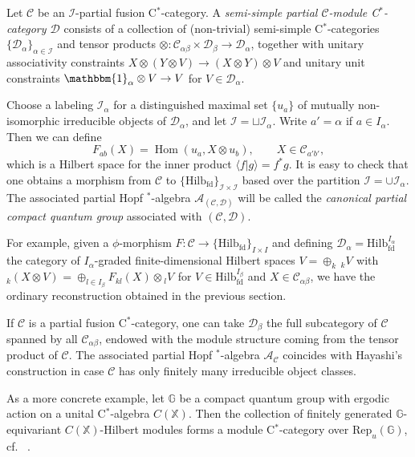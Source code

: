 \documentclass[10pt]{article}
\DeclareMathOperator{\fin}{\mathrm{fd}}
\DeclareMathOperator{\Hom}{Hom}
\newcommand{\G}{\mathbb{G}}
\newcommand{\CatC}{\mathcal{C}}
\newcommand{\CatD}{\mathcal{D}}
\newcommand{\CatCC}{\mathscr{C}}
\newcommand{\CatDD}{\mathscr{D}}
\newcommand{\Hilb}{\mathrm{Hilb}}
\newcommand{\Rep}{\mathrm{Rep}}
\newcommand{\GrDA}[3]{{}_{#2}#1_{#3}} %
\theoremstyle{definition}
\numberwithin{equation}{section}
\begin{document}
Let $\CatCC$ be an $\mathscr{I}$-partial fusion C$^*$-category. A \emph{semi-simple partial $\CatCC$-module C$^*$-category $\CatDD$} consists of a collection of (non-trivial) semi-simple C$^*$-categories $\{\CatD_{\alpha}\}_{\alpha\in \mathscr{I}}$ and  tensor products $\otimes: \CatC_{\alpha\beta}\times \CatD_{\beta}\rightarrow \CatD_{\alpha}$, together with unitary associativity constraints $X\otimes (Y\otimes V)\rightarrow (X\otimes Y)\otimes V$ and unitary unit constraints $\mathbbm{1}_{\alpha} \otimes V \rightarrow V$ for $V\in \CatD_{\alpha}$.

Choose a labeling $\mathcal{I}_{\alpha}$ for a distinguished maximal set $\{u_a\}$ of mutually non-isomorphic irreducible objects of $\CatD_{\alpha}$, and let $\mathcal{I} = \sqcup \mathcal{I}_{\alpha}$. Write $a' = \alpha$ if $a\in I_{\alpha}$. Then we can define \[F_{ab}(X)  = \Hom(u_a,  X\otimes u_b),\qquad X\in \CatC_{a'b'},\] which is a Hilbert space for the inner product $\langle f| g \rangle = f^*g$. It is easy to check that one obtains a morphism from $\CatCC$ to $\{\Hilb_{\fin}\}_{\mathcal{I}\times \mathcal{I}}$ based over the partition $\mathcal{I} = \cup \mathcal{I}_{\alpha}$. The associated partial Hopf $^*$-algebra $\mathscr{A}_{(\CatCC,\CatDD)}$ will be called the \emph{canonical partial compact quantum group} associated with $(\CatCC,\CatDD)$. 

For example, given a $\phi$-morphism $F:\CatCC \rightarrow  \{\Hilb_{\fin}\}_{I\times I}$ and defining $\CatDD_{\alpha} =\Hilb_{\fin}^{I_{\alpha}}$ the category of $I_{\alpha}$-graded finite-dimensional Hilbert spaces $V = \oplus_k\, \GrDA{V}{k}{}$ with $\GrDA{\left(X\otimes V\right)}{k}{} = \oplus_{l\in I_{\beta}} F_{kl}(X)\otimes \GrDA{V}{l}{}$ for $V\in \Hilb_{\fin}^{I_{\beta}}$ and $X\in \CatC_{\alpha\beta}$, we have the ordinary reconstruction obtained in the previous section. 

If $\CatCC$ is a partial fusion C$^*$-category, one can take $\CatD_{\beta}$ the full subcategory of $\CatC$ spanned by all $\CatC_{\alpha\beta}$, endowed with the module structure coming from the tensor product of $\CatCC$. The associated partial Hopf $^*$-algebra $\mathscr{A}_{\CatCC}$ coincides with Hayashi's construction \cite{Hay8} in case $\CatCC$ has only finitely many irreducible object classes. 

As a more concrete example, let $\G$ be a compact quantum group with ergodic action on a unital C$^*$-algebra $C(\mathbb{X})$. Then the collection of finitely generated $\G$-equivariant $C(\mathbb{X})$-Hilbert modules forms a module C$^*$-category over $\Rep_u(\G)$, cf.~ \cite{DCY1}. 
\end{document}
